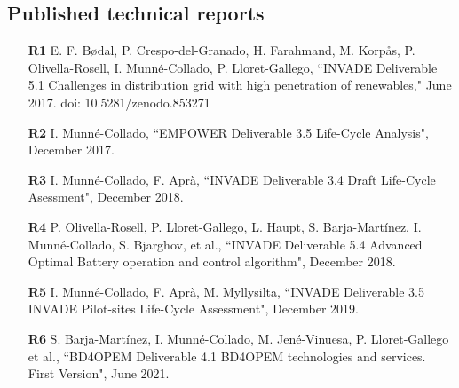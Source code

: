 \subsection*{Published technical reports}

\begin{itemize}
	\item[\textbf{R1}] E. F. B\o{}dal, P. Crespo-del-Granado, H. Farahmand, M. Korp\aa{}s, P. Olivella-Rosell, I. Munn\'{e}-Collado, P. Lloret-Gallego, ``INVADE Deliverable 5.1 Challenges in distribution grid with high penetration of renewables," June 2017. doi: 10.5281/zenodo.853271
	\item[\textbf{R2}] I. Munn\'{e}-Collado, ``EMPOWER Deliverable 3.5 Life-Cycle Analysis", December 2017.
	\item[\textbf{R3}] I. Munn\'{e}-Collado, F. Apr\`{a}, ``INVADE Deliverable 3.4 Draft Life-Cycle Asessment", December 2018.
	\item[\textbf{R4}] P. Olivella-Rosell, P. Lloret-Gallego, L. Haupt, S. Barja-Mart\'{i}nez, I. Munn\'{e}-Collado, S. Bjarghov, et al., ``INVADE Deliverable 5.4 Advanced Optimal Battery operation and control algorithm", December 2018.
	\item[\textbf{R5}] I. Munn\'{e}-Collado, F. Apr\`{a}, M. Myllysilta, ``INVADE Deliverable 3.5 INVADE Pilot-sites Life-Cycle Assessment", December 2019.	
	\item[\textbf{R6}] S. Barja-Mart\'{i}nez, I. Munn\'{e}-Collado, M. Jen\'{e}-Vinuesa, P. Lloret-Gallego et al., ``BD4OPEM Deliverable 4.1 BD4OPEM technologies and services. First Version", June 2021.	
\end{itemize}
